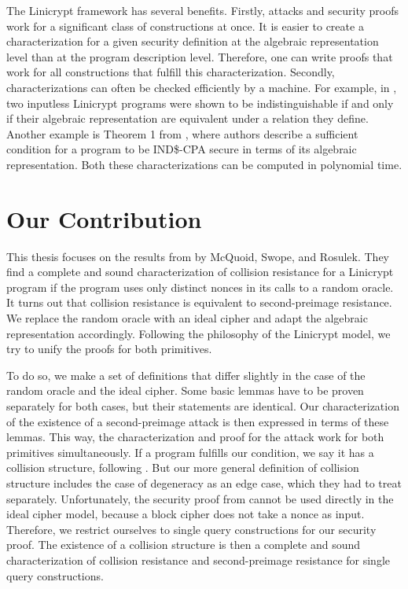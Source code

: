The Linicrypt framework has several benefits.
Firstly, attacks and security proofs work for a significant class of constructions at once.
It is easier to create a characterization for a given security definition at the algebraic representation level than at the program description level. 
Therefore, one can write proofs that work for all constructions that fulfill this characterization.
Secondly, characterizations can often be checked efficiently by a machine.
For example, in \cite{C:CarRos16},
two inputless Linicrypt programs were shown to be indistinguishable if and only if their algebraic representation are equivalent under a relation they define.
Another example is Theorem 1 from \cite{EPRINT:HolRosRoy22},
where authors describe a sufficient condition for a program to be IND\$-CPA secure in terms of its algebraic representation.
Both these characterizations can be computed in polynomial time.

\section{Our Contribution}

This thesis focuses on the results from \cite{TCC:McQSwoRos19} by McQuoid, Swope, and Rosulek.
They find a complete and sound characterization of collision resistance for a Linicrypt program
if the program uses only distinct nonces in its calls to a random oracle.
It turns out that collision resistance is equivalent to second-preimage resistance.
We replace the random oracle with an ideal cipher and adapt the algebraic representation accordingly.
Following the philosophy of the Linicrypt model,
we try to unify the proofs for both primitives.



To do so, we make a set of definitions that differ slightly in the case of the random oracle and the ideal cipher.
Some basic lemmas have to be proven separately for both cases, but their statements are identical.
Our characterization of the existence of a second-preimage attack is then expressed in terms of these lemmas.
This way, the characterization and proof for the attack work for both primitives simultaneously.
If a program fulfills our condition, we say it has a collision structure, following \cite{TCC:McQSwoRos19}.
But our more general definition of collision structure includes the case of degeneracy as an edge case,
which they had to treat separately.
Unfortunately, the security proof from \cite{TCC:McQSwoRos19} cannot be used directly in the ideal cipher model,
because a block cipher does not take a nonce as input.
Therefore, we restrict ourselves to single query constructions for our security proof.
The existence of a collision structure is then a complete and sound characterization of collision resistance and second-preimage resistance for single query constructions.

